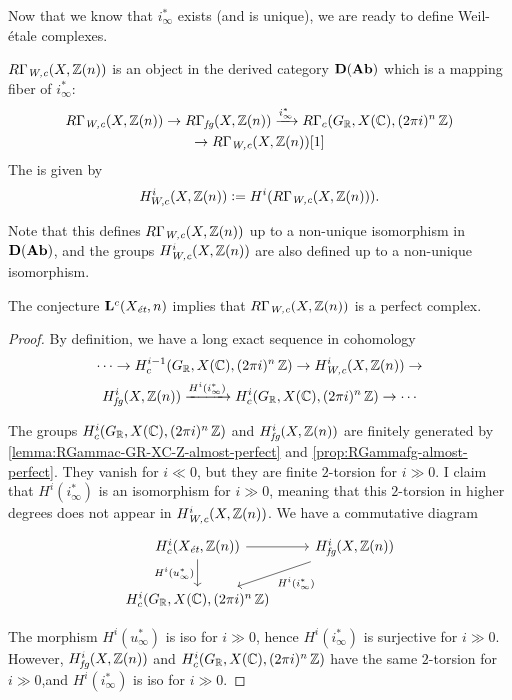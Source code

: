 Now that we know that $i_\infty^*$ exists (and is unique), we are ready to
define Weil-étale complexes.

\begin{definition}
  \label{dfn:RGammaWc}
  $R\Gamma_\text{\it W,c} (X,\mathbb{Z}(n))$ is an object in the derived category
  $\text{\bf D} (\text{\bf Ab})$ which is a mapping fiber of $i_\infty^*$:
  \begin{multline*}
    R\Gamma_\text{\it W,c} (X,\mathbb{Z}(n)) \to
    R\Gamma_\text{\it fg} (X, \mathbb{Z} (n)) \xrightarrow{i_\infty^*}
    R\Gamma_c (G_{\mathbb{R}}, X (\mathbb{C}), (2\pi i)^n\,\mathbb{Z}) \\
    \to R\Gamma_\text{\it W,c} (X,\mathbb{Z}(n)) [1]
  \end{multline*}
  The  is given by
  $$H_{W,c}^i (X, \mathbb{Z} (n)) \mathrel{\mathop:}= H^i (R\Gamma_\text{\it W,c} (X,\mathbb{Z}(n))).$$
\end{definition}

Note that this defines $R\Gamma_\text{\it W,c} (X,\mathbb{Z}(n))$ up to a non-unique
isomorphism in $\text{\bf D} (\text{\bf Ab})$, and the groups
$H_\text{\it W,c}^i (X, \mathbb{Z} (n))$ are also defined up to a non-unique
isomorphism.

\begin{proposition}
  \label{prop:RGammaWc-perfect}
  The conjecture $\mathbf{L}^c (X_\text{\it ét}, n)$ implies that
  $R\Gamma_\text{\it W,c} (X,\mathbb{Z}(n))$ is a perfect complex.

  \begin{proof}
    By definition, we have a long exact sequence in cohomology
    \begin{multline*}
      \cdots \to H^{i-1}_c (G_{\mathbb{R}}, X (\mathbb{C}), (2\pi i)^n\,\mathbb{Z}) \to
      H^i_\text{\it W,c} (X,\mathbb{Z}(n)) \to\\
      H^i_\text{\it fg} (X,\mathbb{Z}(n)) \xrightarrow{H^i (i_\infty^*)}
      H^i_c (G_{\mathbb{R}}, X (\mathbb{C}), (2\pi i)^n\,\mathbb{Z}) \to \cdots
    \end{multline*}

    The groups $H^i_c (G_{\mathbb{R}}, X (\mathbb{C}), (2\pi i)^n\,\mathbb{Z})$ and
    $H^i_\text{\it fg} (X, \mathbb{Z}(n))$ are finitely generated by
    \ref{lemma:RGammac-GR-XC-Z-almost-perfect} and
    \ref{prop:RGammafg-almost-perfect}. They vanish for $i \ll 0$, but they are
    finite $2$-torsion for $i \gg 0$. I claim that $H^i (i_\infty^*)$ is an
    isomorphism for $i \gg 0$, meaning that this $2$-torsion in higher degrees
    does not appear in $H^i_\text{\it W,c} (X,\mathbb{Z}(n))$. We have a commutative
    diagram
    \[ \begin{tikzcd}
        H^i_c (X_\text{\it ét}, \ZZ (n))\ar{r}\ar{d}[swap]{H^i (u_\infty^*)} & H^i_\text{\it fg} (X, \ZZ (n))\ar{dl}{H^i (i_\infty^*)} \\
        H^i_c (G_\RR, X (\CC), (2\pi i)^n\,\ZZ)
      \end{tikzcd} \]

    The morphism $H^i (u_\infty^*)$ is iso for $i \gg 0$, hence
    $H^i (i_\infty^*)$ is surjective for $i \gg 0$.
    However, $H^i_\text{\it fg} (X, \mathbb{Z} (n))$ and
    $H^i_c (G_{\mathbb{R}}, X (\mathbb{C}), (2\pi i)^n\,\mathbb{Z})$ have the same $2$-torsion for
    $i \gg 0$,and $H^i (i_\infty^*)$ is iso for $i \gg 0$.
  \end{proof}
\end{proposition}


